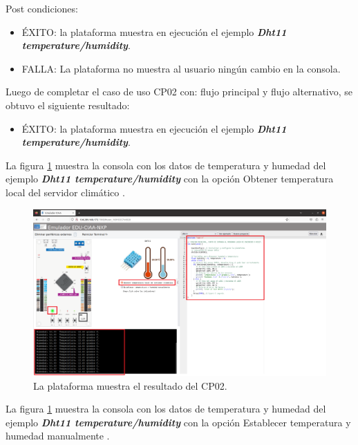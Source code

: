 Post condiciones:
\begin{itemize}
	\item ÉXITO: la plataforma muestra en ejecución el ejemplo \textit{\textbf{Dht11 temperature/humidity}}.
	\item FALLA: La plataforma no muestra al usuario ningún cambio en la consola.
\end{itemize}



Luego de completar el caso de uso CP02 con: flujo principal y flujo alternativo, se obtuvo el siguiente resultado: 

\begin{itemize}
	\item ÉXITO: la plataforma muestra en ejecución el ejemplo \textit{\textbf{Dht11 temperature/humidity}}.
\end{itemize}

La figura \ref{fig:RespuestaEmulador} muestra la consola con los datos de temperatura y humedad del ejemplo \textit{\textbf{Dht11 temperature/humidity}} con la opción \textquotedbl Obtener temperatura local del servidor climático \textquotedbl.

\hfill \break
\hfill \break
\hfill \break

\begin{figure}[ht]
	\centering
	\includegraphics[scale=.28]{./Figures/dht11Opcion1.png}
	\caption{La plataforma muestra el resultado del CP02.}
	\label{fig:RespuestaEmulador}
\end{figure}


La figura \ref{fig:RespuestaEmulador} muestra la consola con los datos de temperatura y humedad del ejemplo \textit{\textbf{Dht11 temperature/humidity}} con la opción \textquotedbl Establecer temperatura y humedad manualmente \textquotedbl.


